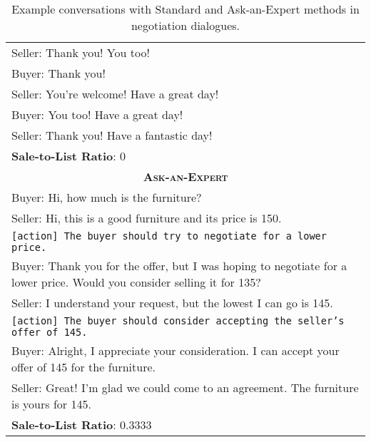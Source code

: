 \begin{table}[]
\begin{tabular}{p{13.5cm}}
    Seller: Thank you! You too!\\
    Buyer: Thank you!\\
    Seller: You're welcome! Have a great day!\\
    Buyer: You too! Have a great day!\\
    Seller: Thank you! Have a fantastic day!\\
    \midrule
    \textbf{Sale-to-List Ratio}: 0 \\
    \midrule
    \midrule
    \multicolumn{1}{c}{\textsc{\textbf{Ask-an-Expert}}}\\
    \midrule
    Buyer: Hi, how much is the furniture?\\
    Seller: Hi, this is a good furniture and its price is 150.\\
    \texttt{[action] The buyer should try to negotiate for a lower price.} \\
    Buyer: Thank you for the offer, but I was hoping to negotiate for a lower price. Would you consider selling it for 135? \\
    Seller: I understand your request, but the lowest I can go is 145. \\
    \texttt{[action] The buyer should consider accepting the seller's offer of 145.} \\
    Buyer: Alright, I appreciate your consideration. I can accept your offer of 145 for the furniture. \\
    Seller: Great! I'm glad we could come to an agreement. The furniture is yours for 145.\\
    \midrule
    \textbf{Sale-to-List Ratio}: 0.3333 \\
    \bottomrule
    \end{tabular}
    \caption{Example conversations with Standard and Ask-an-Expert methods in negotiation dialogues. }
    \label{tab:cb_case_1}
\end{table}



